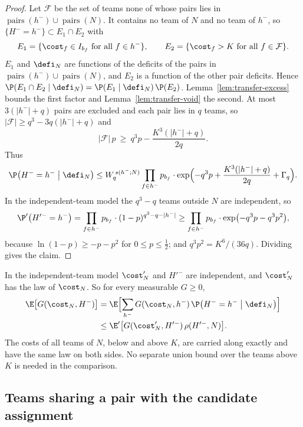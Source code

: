 \begin{proof}
Let $\mathcal F$ be the set of teams none of whose pairs lies in
$\operatorname{pairs}(h^-)\cup\operatorname{pairs}(N)$. It contains no team of $N$ and no team
of $h^-$, so $\{H^-=h^-\}\subset E_1\cap E_2$ with
\[
E_1=\{\cost_f\in I_{b_f}\ \text{for all }f\in h^-\},\qquad
E_2=\{\cost_f>K\ \text{for all }f\in\mathcal F\}.
\]
$E_1$ and $\defi_N$ are functions of the deficits of the pairs in
$\operatorname{pairs}(h^-)\cup\operatorname{pairs}(N)$, and $E_2$ is a function of the other
pair deficits. Hence $\P(E_1\cap E_2\mid\defi_N)=\P(E_1\mid\defi_N)\,\P(E_2)$.
Lemma~\ref{lem:transfer-excess} bounds the first factor and Lemma~\ref{lem:transfer-void} the
second. At most $3(|h^-|+q)$ pairs are excluded and each pair lies in $q$ teams, so
$|\mathcal F|\ge q^3-3q(|h^-|+q)$ and
\[
|\mathcal F|\,p\ \ge\ q^3p-\frac{K^3(|h^-|+q)}{2q}.
\]
Thus
\[
\P\bigl(H^-=h^-\bigm|\defi_N\bigr)\le W_q^{\,s(h^-;N)}\prod_{f\in h^-}p_{b_f}\cdot
\exp\Bigl(-q^3p+\frac{K^3(|h^-|+q)}{2q}+\Gamma_q\Bigr).
\]
In the independent-team model the $q^3-q$ teams outside $N$ are independent, so
\[
\P'\bigl(H'^-=h^-\bigr)=\prod_{f\in h^-}p_{b_f}\cdot(1-p)^{q^3-q-|h^-|}
\ge\prod_{f\in h^-}p_{b_f}\cdot\exp\bigl(-q^3p-q^3p^2\bigr),
\]
because $\ln(1-p)\ge-p-p^2$ for $0\le p\le\tfrac12$; and $q^3p^2=K^6/(36q)$. Dividing gives the
claim.
\end{proof}

In the independent-team model $\cost'_N$ and $H'^-$ are independent, and $\cost'_N$ has the law
of $\cost_N$. So for every measurable $G\ge0$,
\begin{equation}\label{eq:transfer-planted-exp}
\begin{aligned}
\E\bigl[G(\cost_N,H^-)\bigr]
&=\E\Bigl[\sum_{h^-}G(\cost_N,h^-)\,\P\bigl(H^-=h^-\bigm|\defi_N\bigr)\Bigr]\\
&\le\E'\bigl[G(\cost'_N,H'^-)\,\rho(H'^-,N)\bigr].
\end{aligned}
\end{equation}
The costs of all teams of $N$, below and above $K$, are carried along exactly and have the same
law on both sides. No separate union bound over the teams above $K$ is needed in the
comparison.

\subsection{Teams sharing a pair with the candidate assignment}\label{sec:transfer-touch}

